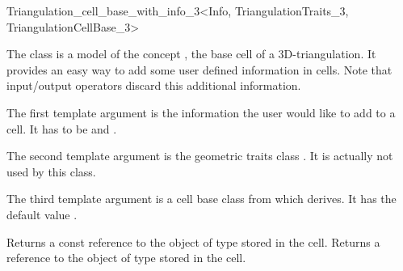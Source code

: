 

\begin{ccRefClass}{Triangulation_cell_base_with_info_3<Info, TriangulationTraits_3, TriangulationCellBase_3>}

\ccDefinition

The class  is a model of the concept
, the base cell of a 3D-triangulation.
It provides an easy way to add some user defined information in cells.
Note that input/output operators discard this additional information.


\ccParameters

The first template argument is the information the user would like to add
to a cell.  It has to be  and .

The second template argument is the geometric traits class
.  It is actually not used by this class.

The third template argument is a cell base class from which
 derives.  It has the default value
.

\ccIsModel {}

\ccInheritsFrom {}

\ccTypes
{}


\ccAccessFunctions
{}
\ccTagFullDeclarations

{Returns a const reference to the object of type  stored in the cell.}
\ccGlue
{}
{Returns a reference to the object of type  stored in the cell.}

\ccSeeAlso

\\

\end{ccRefClass}
